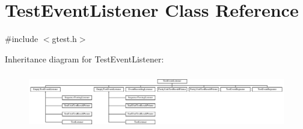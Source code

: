 \hypertarget{classtesting_1_1TestEventListener}{\section{\-Test\-Event\-Listener \-Class \-Reference}
\label{d0/d51/classtesting_1_1TestEventListener}
}


{\ttfamily \#include $<$gtest.\-h$>$}

\-Inheritance diagram for \-Test\-Event\-Listener\-:\begin{figure}[H]
\begin{center}
\leavevmode
\includegraphics[height=2.485207cm]{d0/d51/classtesting_1_1TestEventListener}
\end{center}
\end{figure}
